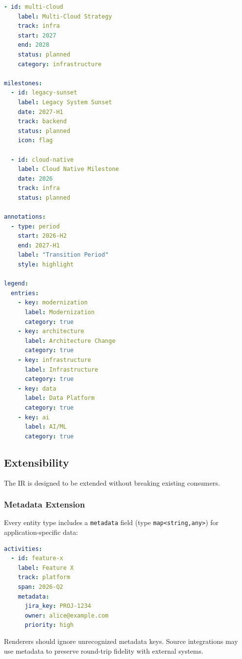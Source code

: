 \begin{lstlisting}[language=yaml,caption={Architecture evolution timeline},label={lst:arch-timeline}]
  - id: multi-cloud
    label: Multi-Cloud Strategy
    track: infra
    start: 2027
    end: 2028
    status: planned
    category: infrastructure

milestones:
  - id: legacy-sunset
    label: Legacy System Sunset
    date: 2027-H1
    track: backend
    status: planned
    icon: flag

  - id: cloud-native
    label: Cloud Native Milestone
    date: 2026
    track: infra
    status: planned

annotations:
  - type: period
    start: 2026-H2
    end: 2027-H1
    label: "Transition Period"
    style: highlight

legend:
  entries:
    - key: modernization
      label: Modernization
      category: true
    - key: architecture
      label: Architecture Change
      category: true
    - key: infrastructure
      label: Infrastructure
      category: true
    - key: data
      label: Data Platform
      category: true
    - key: ai
      label: AI/ML
      category: true
\end{lstlisting}


\subsection{Extensibility}
\label{sec:ir-extensibility}

The IR is designed to be extended without breaking existing consumers.

\subsubsection{Metadata Extension}

Every entity type includes a \texttt{metadata} field (type \texttt{map<string,any>})
for application-specific data:

\begin{lstlisting}[language=yaml]
activities:
  - id: feature-x
    label: Feature X
    track: platform
    span: 2026-Q2
    metadata:
      jira_key: PROJ-1234
      owner: alice@example.com
      priority: high
\end{lstlisting}

Renderers should ignore unrecognized metadata keys. Source integrations may use
metadata to preserve round-trip fidelity with external systems.

